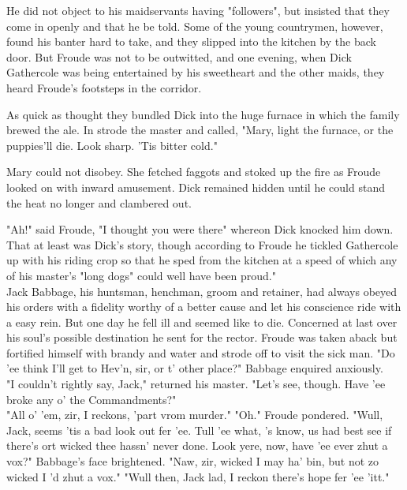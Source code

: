 He did not object to his maidservants having "followers", but insisted that they come in openly and that he be told. Some of the young countrymen, however, found his banter hard to take, and they slipped into the kitchen by the back door. But Froude was not to be outwitted, and one evening, when Dick Gathercole was being entertained by his sweetheart and the other maids, they heard Froude's footsteps in the corridor.

As quick as thought they bundled Dick into the huge furnace in which the family brewed the ale. In strode the master and called, "Mary, light the furnace, or the puppies'll die. Look sharp. 'Tis bitter cold."

Mary could not disobey. She fetched faggots and stoked up the fire as Froude looked on with inward amusement. Dick remained hidden until he could stand the heat no longer and clambered out.

"Ah!" said Froude, "I thought you were there"   whereon Dick knocked him down.\\
 That at least was Dick's story, though according to Froude he tickled Gathercole up with his riding crop so that he sped from the kitchen at a speed of which any of his master's "long dogs" could well have been proud."\\
Jack Babbage, his huntsman, henchman, groom and retainer, had always obeyed his orders with a fidelity worthy of a better cause and let his conscience ride with a easy rein. But one day he fell ill and seemed like to die. Concerned at last over his soul's possible destination he sent for the rector. Froude was taken aback but fortified himself with brandy and water and strode off to visit the sick man.
 "Do 'ee think I'll get to Hev'n, sir, or t' other place?" Babbage enquired anxiously.\\
 "I couldn't rightly say, Jack," returned his master. "Let's see, though. Have 'ee broke any o' the Commandments?"\\
 "All o' 'em, zir, I reckons, 'part vrom murder." 
 "Oh." Froude pondered. "Wull, Jack, seems 'tis a bad look out fer 'ee. Tull 'ee what, 's know, us had best see if there's ort wicked thee hassn' never done. Look yere, now, have 'ee ever zhut a vox?"
 Babbage's face brightened. "Naw, zir, wicked I may ha' bin, but not zo wicked I 'd zhut a vox."
 "Wull then, Jack lad, I reckon there's hope fer 'ee 'itt."
